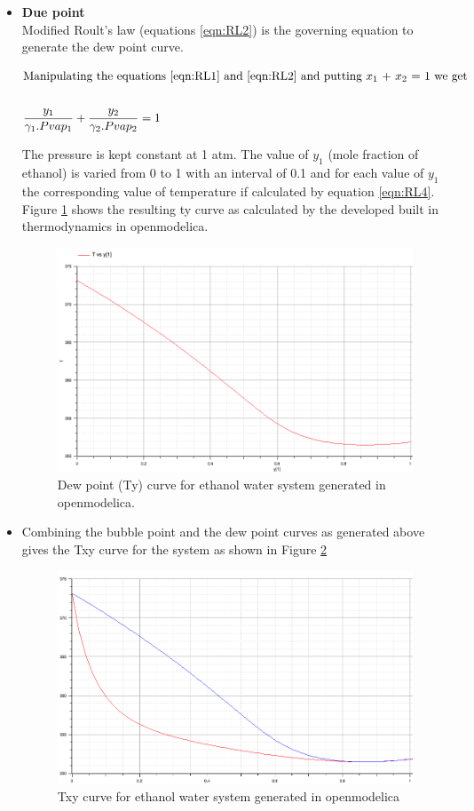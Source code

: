 \documentclass[12pt]{report}
\begin{document}
\begin{itemize}
\item {\textbf{Due point}} \\
Modified Roult's law (equations \ref{eqn:RL2}) is the governing equation to generate the dew point curve.

\begin{align}
\intertext{Manipulating the equations \ref{eqn:RL1} and \ref{eqn:RL2} and putting $x_1$ + $x_2$ = 1 we get} \nonumber \\
\frac{y_1}{\gamma_1.Pvap_1} + \frac{y_2}{\gamma_2.Pvap_2}  = 1 \label{eqn:RL4}
\end{align} 

The pressure is kept constant at 1 atm. The value of $y_1$ (mole fraction of ethanol) is varied from 0 to 1 with an interval of 0.1 and for each value of $y_1$ the corresponding value of temperature if calculated by equation \ref{eqn:RL4}. Figure \ref{fig:DP} shows the resulting ty curve as calculated by the developed built in thermodynamics in openmodelica.

\begin{figure}[t]
\centering
\includegraphics[width=0.8\linewidth]{DP}
\caption{Dew point (Ty) curve for ethanol water system generated in openmodelica.}
\label{fig:DP}
\end{figure}

\item Combining the bubble point and the dew point curves as generated above gives the Txy curve for the system as shown in Figure \ref{fig:VLE}
\begin{figure}
\centering
\includegraphics[width=0.8\linewidth]{VLE}
\caption{Txy curve for ethanol water system generated in openmodelica}
\label{fig:VLE}
\end{figure}


\end{itemize}
\end{document}
